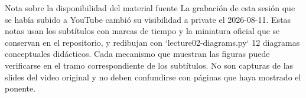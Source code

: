 \makecscover

\begin{warningbox}{Nota sobre la disponibilidad del material fuente}
La grabación de esta sesión que se había subido a YouTube cambió su visibilidad a private el 2026-08-11. Estas notas usan los subtítulos con marcas de tiempo y la miniatura oficial que se conservan en el repositorio, y redibujan con `lecture02-diagrams.py` 12 diagramas conceptuales didácticos. Cada mecanismo que muestran las figuras puede verificarse en el tramo correspondiente de los subtítulos. No son capturas de las slides del video original y no deben confundirse con páginas que haya mostrado el ponente.
\end{warningbox}

